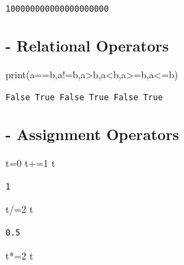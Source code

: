 \documentclass[
  letterpaper,
  DIV=11,
  numbers=noendperiod]{scrreprt}
\newenvironment{Shaded}{\begin{snugshade}}{\end{snugshade}}
\newcommand{\BuiltInTok}[1]{\textcolor[rgb]{0.00,0.23,0.31}{#1}}
\newcommand{\DecValTok}[1]{\textcolor[rgb]{0.68,0.00,0.00}{#1}}
\newcommand{\NormalTok}[1]{\textcolor[rgb]{0.00,0.23,0.31}{#1}}
\newcommand{\OperatorTok}[1]{\textcolor[rgb]{0.37,0.37,0.37}{#1}}
\begin{document}
\begin{verbatim}
100000000000000000000
\end{verbatim}

\subsection{- Relational Operators}\label{relational-operators}

\begin{Shaded}
\begin{Highlighting}[]
\BuiltInTok{print}\NormalTok{(a}\OperatorTok{==}\NormalTok{b,a}\OperatorTok{!=}\NormalTok{b,a}\OperatorTok{\textgreater{}}\NormalTok{b,a}\OperatorTok{\textless{}}\NormalTok{b,a}\OperatorTok{\textgreater{}=}\NormalTok{b,a}\OperatorTok{\textless{}=}\NormalTok{b)}
\end{Highlighting}
\end{Shaded}

\begin{verbatim}
False True False True False True
\end{verbatim}

\subsection{- Assignment Operators}\label{assignment-operators}

\begin{Shaded}
\begin{Highlighting}[]
\NormalTok{t}\OperatorTok{=}\DecValTok{0}
\NormalTok{t}\OperatorTok{+=}\DecValTok{1}
\NormalTok{t}
\end{Highlighting}
\end{Shaded}

\begin{verbatim}
1
\end{verbatim}

\begin{Shaded}
\begin{Highlighting}[]
\NormalTok{t}\OperatorTok{/=}\DecValTok{2}
\NormalTok{t}
\end{Highlighting}
\end{Shaded}

\begin{verbatim}
0.5
\end{verbatim}

\begin{Shaded}
\begin{Highlighting}[]
\NormalTok{t}\OperatorTok{*=}\DecValTok{2}
\NormalTok{t}
\end{Highlighting}
\end{Shaded}
\end{document}
